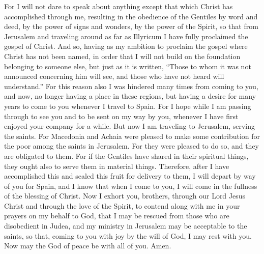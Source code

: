 \begin{biblechapter}
\verse For I will not dare to speak about anything except that which Christ has accomplished through me, resulting in the obedience of the Gentiles by word and deed,
\verse by the power of signs and wonders, by the power of the Spirit, so that from Jerusalem and traveling around as far as Illyricum I have fully proclaimed the gospel of Christ.
\verse And so, having as my ambition to proclaim the gospel where Christ has not been named, in order that I will not build on the foundation belonging to someone else,
\verse but just as it is written, “Those to whom it was not announced concerning him will see, 
and those who have not heard will understand.”
 For this reason also I was hindered many times from coming to you,
\verse and now, no longer having a place in these regions, but having a desire for many years to come to you
\verse whenever I travel to Spain. For I hope while I am passing through to see you and to be sent on my way by you, whenever I have first enjoyed your company for a while.
\verse But now I am traveling to Jerusalem, serving the saints.
\verse For Macedonia and Achaia were pleased to make some contribution for the poor among the saints in Jerusalem.
\verse For they were pleased to do so, and they are obligated to them. For if the Gentiles have shared in their spiritual things, they ought also to serve them in material things.
\verse Therefore, after I have accomplished this and sealed this fruit for delivery to them, I will depart by way of you for Spain,
\verse and I know that when I come to you, I will come in the fullness of the blessing of Christ.
\verse Now I exhort you, brothers, through our Lord Jesus Christ and through the love of the Spirit, to contend along with me in your prayers on my behalf to God,
\verse that I may be rescued from those who are disobedient in Judea, and my ministry in Jerusalem may be acceptable to the saints,
\verse so that, coming to you with joy by the will of God, I may rest with you.
\verse Now may the God of peace be with all of you. Amen.
\end{biblechapter}

